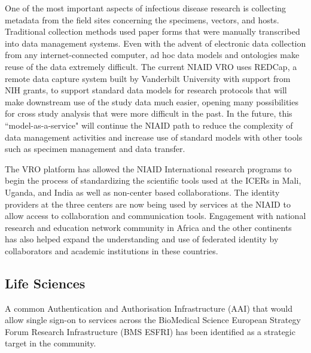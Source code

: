\documentclass[fleqn,10pt]{wlscirep}
\begin{document}
{One of the most important aspects of infectious disease research is collecting metadata from the field sites concerning the specimens, vectors, and hosts.  Traditional collection methods used paper forms that were manually transcribed into data management systems.  Even with the advent of electronic data collection from any internet-connected computer, ad hoc data models and ontologies make reuse of the data extremely difficult.  The current NIAID VRO uses REDCap, a remote data capture system built by Vanderbilt University with support from NIH grants, to support standard data models for research protocols that will make downstream use of the study data much easier, opening many possibilities for cross study analysis that were more difficult in the past.  In the future, this ``model-as-a-service" will continue the NIAID path to reduce the complexity of data management activities and increase use of standard models with other tools such as specimen management and data transfer.

The VRO platform has allowed the NIAID International research programs to begin the process of standardizing the scientific tools used at the ICERs in Mali, Uganda, and India as well as non-center based collaborations.  The identity providers at the three centers are now being used by services at the NIAID to allow access to collaboration and communication tools.  Engagement with national research and education network community in Africa and the other continents has also helped expand the understanding and use of federated identity by collaborators and academic institutions in these countries.


\subsection{Life Sciences}
A common Authentication and Authorisation Infrastructure (AAI) that would allow single sign-on to services across the BioMedical Science European Strategy Forum Research Infrastructure (BMS ESFRI) has been identified as a strategic target in the community.

}
\end{document}
